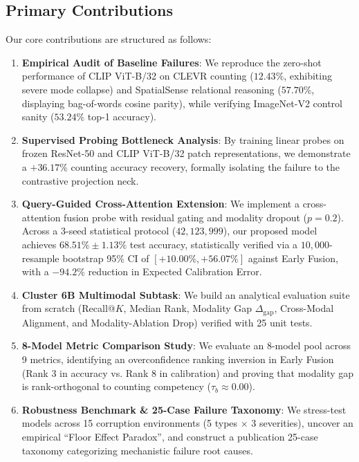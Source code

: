 \documentclass[conference]{IEEEtran}
\begin{document}
\subsection{Primary Contributions}
Our core contributions are structured as follows:
\begin{enumerate}
    \item \textbf{Empirical Audit of Baseline Failures}: We reproduce the zero-shot performance of CLIP ViT-B/32 on CLEVR counting \cite{johnson2017clevr} ($12.43\%$, exhibiting severe mode collapse) and SpatialSense relational reasoning \cite{yang2019spatialsense} ($57.70\%$, displaying bag-of-words cosine parity), while verifying ImageNet-V2 control sanity ($53.24\%$ top-1 accuracy).
    \item \textbf{Supervised Probing Bottleneck Analysis}: By training linear probes on frozen ResNet-50 and CLIP ViT-B/32 patch representations, we demonstrate a $+36.17\%$ counting accuracy recovery, formally isolating the failure to the contrastive projection neck.
    \item \textbf{Query-Guided Cross-Attention Extension}: We implement a cross-attention fusion probe with residual gating and modality dropout ($p=0.2$). Across a 3-seed statistical protocol ($42, 123, 999$), our proposed model achieves $68.51\% \pm 1.13\%$ test accuracy, statistically verified via a $10,000$-resample bootstrap 95\% CI of $[+10.00\%, +56.07\%]$ against Early Fusion, with a $-94.2\%$ reduction in Expected Calibration Error.
    \item \textbf{Cluster 6B Multimodal Subtask}: We build an analytical evaluation suite from scratch (Recall@$K$, Median Rank, Modality Gap $\Delta_{\text{gap}}$, Cross-Modal Alignment, and Modality-Ablation Drop) verified with 25 unit tests.
    \item \textbf{8-Model Metric Comparison Study}: We evaluate an 8-model pool across 9 metrics, identifying an overconfidence ranking inversion in Early Fusion (Rank 3 in accuracy vs. Rank 8 in calibration) and proving that modality gap is rank-orthogonal to counting competency ($\tau_b \approx 0.00$).
    \item \textbf{Robustness Benchmark \& 25-Case Failure Taxonomy}: We stress-test models across 15 corruption environments (5 types $\times$ 3 severities), uncover an empirical ``Floor Effect Paradox'', and construct a publication 25-case taxonomy categorizing mechanistic failure root causes.
\end{enumerate}

\end{document}
